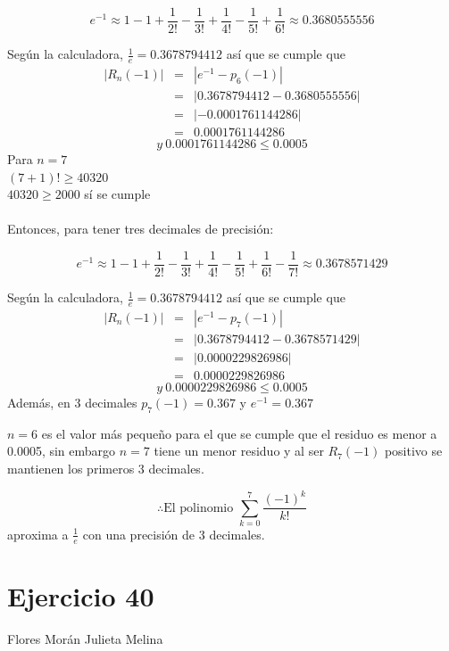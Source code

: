 \documentclass[12pt]{article}
\begin{document}
\[
e^{-1} \approx 1 -1 + \frac{1}{2!} - \frac{1}{3!} + \frac{1}{4!} - \frac{1}{5!}  + \frac{1}{6!} \approx 0.3680555556
\]

Según la calculadora, $\frac{1}{e} = 0.3678794412$
así que se cumple que 
\begin{eqnarray}
\left| R_n (-1)  \right| 
& = & \left| e^{-1}- p_6(-1)  \right|\nonumber
\\
& = & \left| 0.3678794412 - 0.3680555556\right|\nonumber
\\
& = & \left| -0.0001761144286 \right|  \nonumber
\\
& = & 0.0001761144286  \nonumber 
\end{eqnarray}
\[ y ~ 0.0001761144286  \leq 0.0005 \]
Para $n = 7$ \\
$(7+1)! \geq 40320$ \\
$ 40320 \geq  2000$ sí se cumple \\ \\
Entonces, para tener tres decimales de precisión:

\[
e^{-1} \approx 1 -1 + \frac{1}{2!} - \frac{1}{3!} + \frac{1}{4!} - \frac{1}{5!}  + \frac{1}{6!} -  \frac{1}{7!} \approx 0.3678571429
\]

Según la calculadora, $\frac{1}{e} = 0.3678794412$
así que se cumple que 
\begin{eqnarray}
\left| R_n (-1)  \right| 
& = & \left| e^{-1}- p_7(-1)  \right|\nonumber
\\
& = & \left| 0.3678794412 - 0.3678571429\right|\nonumber
\\
& = & \left| 0.0000229826986 \right|  \nonumber
\\
& = & 0.0000229826986 \nonumber 
\end{eqnarray}
\[ y ~ 0.0000229826986  \leq 0.0005 \]
Además, en 3 decimales $p_7(-1) = 0.367$  y $e^{-1} = 0.367 $

$n = 6$ es el valor más pequeño para el que se cumple que el residuo es menor a 0.0005, sin embargo $n=7$  tiene un menor residuo y al ser $ R_7(-1)$ positivo se mantienen los primeros 3 decimales.

\[
\therefore \text{El polinomio } \sum_{k=0}^{7}\frac{(-1)^{k}}{k!} 
\]
aproxima a $\frac{1}{e}$  con una precisión de 3 decimales.
\section{Ejercicio 40} Flores Morán Julieta Melina \\
\end{document}
